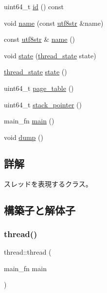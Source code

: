 \begin{DoxyCompactItemize}
uint64\+\_\+t \hyperlink{classthread_a490d6ffc5beccdf584f49fa85cc12d9d}{id} () const
\item 
void \hyperlink{classthread_a1edac2ded94641cdef9dacb04efb5c85}{name} (const \hyperlink{classutf8str}{utf8str} \&name)
\item 
const \hyperlink{classutf8str}{utf8str} \& \hyperlink{classthread_a7e52f57766d1d11b6dbda15955c4a8ad}{name} ()
\item 
void \hyperlink{classthread_a75bf27fd88692ce8a30ca04e3c397681}{state} (\hyperlink{thread_8h_a4b1b32c1fc744438f665f0f1932dd207}{thread\+\_\+state} state)
\item 
\hyperlink{thread_8h_a4b1b32c1fc744438f665f0f1932dd207}{thread\+\_\+state} \hyperlink{classthread_a3bbc0f9939912ffb6d31439e36d09e94}{state} ()
\item 
uint64\+\_\+t \hyperlink{classthread_a2c10391e5b23ac4ff0ff99765bd5728d}{page\+\_\+table} ()
\item 
uint64\+\_\+t \hyperlink{classthread_a813caa9cffcc7c21008e62235de71b54}{stack\+\_\+pointer} ()
\item 
main\+\_\+fn \hyperlink{classthread_aa4a8c5526714238ea8890badce737c08}{main} ()
\item 
void \hyperlink{classthread_a4b78d34fbeff62ace13a4e9a6d4515f4}{dump} ()
\end{DoxyCompactItemize}


\subsection{詳解}
スレッドを表現するクラス。 

\subsection{構築子と解体子}
\hypertarget{classthread_a1db10940bc1734720d5a562d046b2d41}{}\label{classthread_a1db10940bc1734720d5a562d046b2d41} 
\subsubsection{\texorpdfstring{thread()}{thread()}\hspace{0.1cm}{\footnotesize\ttfamily [1/4]}}
{\footnotesize\ttfamily thread\+::thread (\begin{DoxyParamCaption}\item[{main\+\_\+fn}]{main }\end{DoxyParamCaption})}

